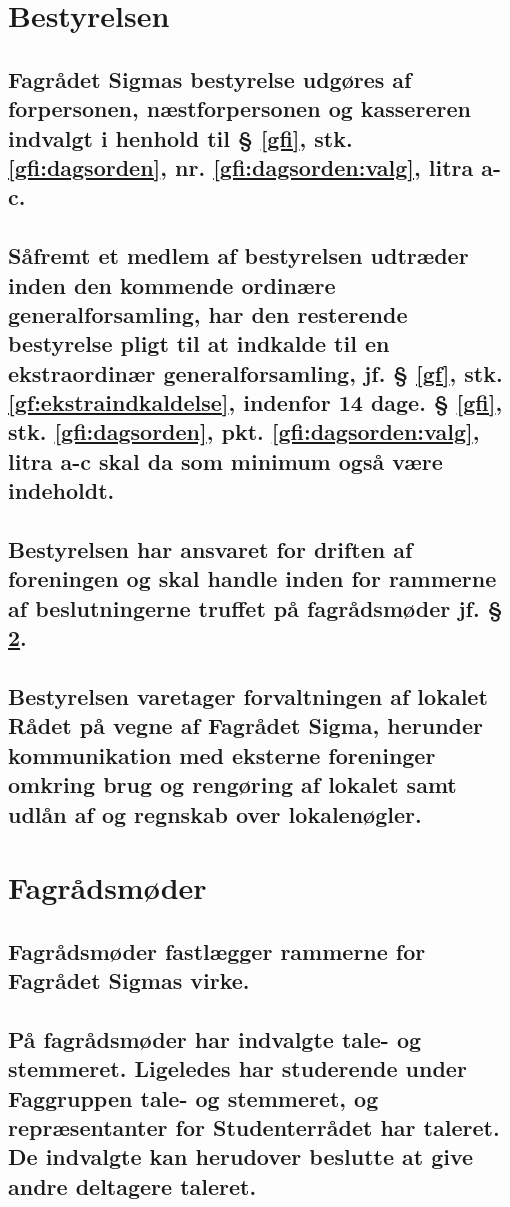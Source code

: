 \documentclass[10pt, danish]{article}
\begin{document}
	\section{Bestyrelsen}\label{Best}
	
        \subsection{Fagrådet Sigmas bestyrelse udgøres af forpersonen, næstforpersonen og kassereren indvalgt i henhold til § \ref{gfi}, stk. \ref{gfi:dagsorden}, nr. \ref{gfi:dagsorden:valg}, litra a-c.}
	
        \subsection{Såfremt et medlem af bestyrelsen udtræder inden den kommende ordinære generalforsamling, har den resterende bestyrelse pligt til at indkalde til en ekstraordinær generalforsamling, jf. § \ref{gf}, stk. \ref{gf:ekstraindkaldelse}, indenfor 14 dage. § \ref{gfi}, stk. \ref{gfi:dagsorden}, pkt. \ref{gfi:dagsorden:valg}, litra a-c skal da som minimum også være indeholdt.}
	
	\subsection{Bestyrelsen har ansvaret for driften af foreningen og skal handle inden for rammerne af beslutningerne truffet på fagrådsmøder jf. § \ref{FRM}.}
	
	\subsection{Bestyrelsen varetager forvaltningen af lokalet Rådet på vegne af Fagrådet Sigma, herunder kommunikation med eksterne foreninger omkring brug og rengøring af lokalet samt udlån af og regnskab over lokalenøgler.}
	
	\section{Fagrådsmøder}\label{FRM}
	
	\subsection{Fagrådsmøder fastlægger rammerne for Fagrådet Sigmas virke.}\label{FRM:daglig}
	
	\subsection{På fagrådsmøder har indvalgte tale- og stemmeret. Ligeledes har studerende under Faggruppen tale- og stemmeret, og repræsentanter for Studenterrådet har taleret. De indvalgte kan herudover beslutte at give andre deltagere taleret.}\label{FRM:stemmeret}
	
\end{document}
